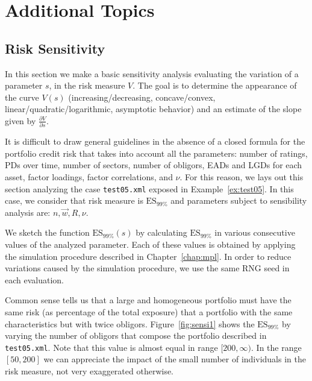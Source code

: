 \documentclass[11pt,fleqn]{book} %
\begin{document}
\chapter{Additional Topics}

\section{Risk Sensitivity}

In this section we make a basic sensitivity analysis evaluating the variation 
of a parameter $s$, in the risk measure $V$. The goal is to determine the 
appearance of the curve $V(s)$ (increasing/decreasing, concave/convex, 
linear/quadratic/logarithmic, asymptotic behavior) and an estimate of the 
slope given by $\frac{\partial V}{\partial s}$.

It is difficult to draw general guidelines in the absence of a closed formula 
for the portfolio credit risk that takes into account all the parameters: 
number of ratings, PDs over time, number of sectors, number of obligors, EADs 
and LGDs for each asset, factor loadings, factor correlations, and $\nu$. For 
this reason, we lays out this section analyzing the case \texttt{test05.xml} 
exposed in Example~\ref{ex:test05}. In this case, we consider that risk 
measure is $\text{ES}_{99\%}$ and parameters subject to sensibility analysis 
are: $n, \vec{w}, R, \nu$.

We sketch the function $\text{ES}_{99\%}(s)$ by calculating $\text{ES}_{99\%}$ 
in various consecutive values of the analyzed parameter. Each of these values 
is obtained by applying the simulation procedure described in 
Chapter~\ref{chap:mpl}. In order to reduce variations caused by the simulation 
procedure, we use the same RNG seed in each evaluation.

\begin{example}
	Common sense tells us that a large and homogeneous portfolio must have the 
	same risk (as percentage of the total exposure) that a portfolio with the 
	same characteristics but with twice obligors. Figure~\ref{fig:sensi1}
	shows the $\text{ES}_{99\%}$ by varying the number of obligors that compose 
	the portfolio described in \texttt{test05.xml}. Note that this value is 
	almost equal in range $[200,\infty)$. In the range $[50,200]$ we can 
	appreciate the impact of the small number of individuals in the risk 
	measure, not very exaggerated otherwise.
\end{example}
\end{document}
